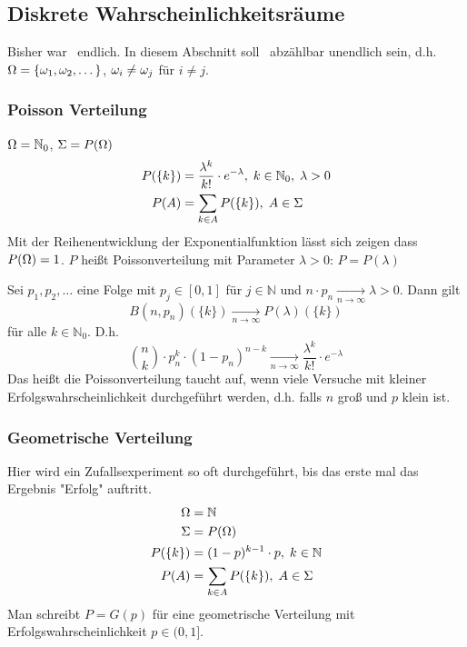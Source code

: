 \subsection{Diskrete Wahrscheinlichkeitsräume}
Bisher war \tO\ endlich. In diesem Abschnitt soll \tO\ abzählbar unendlich sein, d.h.
$\Omega = \{ \omega_1, \omega_2, \dots\}$, $\omega_i \neq \omega_j$ für $i \neq j$.

\subsubsection{Poisson Verteilung}
$\Omega = \mathbb{N}_0$, $\Sigma = P(\Omega)$
\begin{align*}
    P(\{k\}) & = \frac{\lambda^k}{k!} \cdot e^{-\lambda}, \; k \in \mathbb{N}_0, \; \lambda > 0 \\
    P(A)     & = \sum_{k \in A} P(\{k\}), \; A \in \Sigma
\end{align*}
Mit der Reihenentwicklung der Exponentialfunktion lässt sich zeigen dass $P(\Omega) = 1$.
$P$ heißt Poissonverteilung mit Parameter $\lambda > 0$: $P = P(\lambda)$

\begin{theorem}
    Sei $p_1, p_2, \dots$ eine Folge mit $p_j \in [0, 1]$ für $j \in \mathbb{N}$ und
    $n \cdot p_n \xrightarrow[n \to \infty]{} \lambda > 0$.
    Dann gilt
    \begin{equation*}
        B(n, p_n)(\{k\}) \xrightarrow[n \to \infty]{} P(\lambda)(\{k\})
    \end{equation*}
    für alle $k \in \mathbb{N}_0$. D.h.
    \begin{equation*}
        \binom{n}{k} \cdot p_n^k \cdot (1-p_n)^{n-k} \xrightarrow[n \to \infty]{} \frac{\lambda^k}{k!} \cdot e^{-\lambda}
    \end{equation*}
    Das heißt die Poissonverteilung taucht auf, wenn viele Versuche mit kleiner Erfolgswahrscheinlichkeit
    durchgeführt werden, d.h. falls $n$ groß und $p$ klein ist.
\end{theorem}

\subsubsection{Geometrische Verteilung}
Hier wird ein Zufallsexperiment so oft durchgeführt, bis das erste mal das Ergebnis "Erfolg" auftritt.
\begin{align*}
    \Omega      & = \mathbb{N}                               \\
    \Sigma      & = P(\Omega)                                   \\
    P(\{k\}) & = (1-p)^{k-1} \cdot p, \; k \in \mathbb{N} \\
    P(A)     & = \sum_{k \in A} P(\{k\}), \; A \in \Sigma
\end{align*}
Man schreibt $P = G(p)$ für eine geometrische Verteilung mit Erfolgswahrscheinlichkeit $p \in (0,1]$.